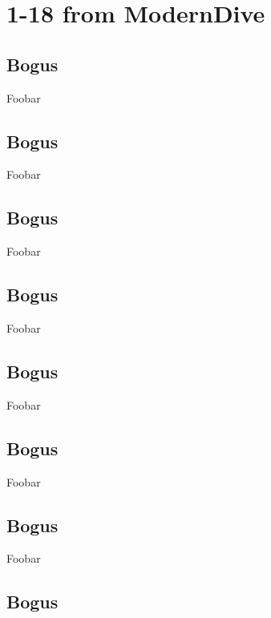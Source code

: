 \documentclass[
  letterpaper,
  DIV=11,
  numbers=noendperiod,
  oneside]{scrreprt}
\begin{document}
\part{1-18 from ModernDive}

\hypertarget{bogus}{%
\chapter{Bogus}\label{bogus}}

Foobar

\hypertarget{bogus-1}{%
\chapter{Bogus}\label{bogus-1}}

Foobar

\hypertarget{bogus-2}{%
\chapter{Bogus}\label{bogus-2}}

Foobar

\hypertarget{bogus-3}{%
\chapter{Bogus}\label{bogus-3}}

Foobar

\hypertarget{bogus-4}{%
\chapter{Bogus}\label{bogus-4}}

Foobar

\hypertarget{bogus-5}{%
\chapter{Bogus}\label{bogus-5}}

Foobar

\hypertarget{bogus-6}{%
\chapter{Bogus}\label{bogus-6}}

Foobar

\hypertarget{bogus-7}{%
\chapter{Bogus}\label{bogus-7}}
\end{document}
